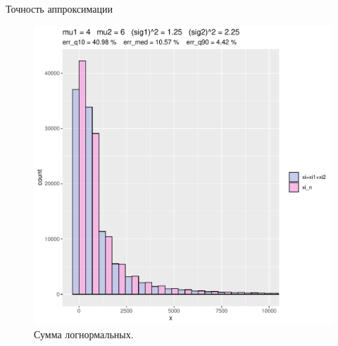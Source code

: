 \documentclass[ucs, notheorems, handout]{beamer}
\begin{document}
\begin{frame}{Точность аппроксимации }
	
	\begin{figure}[h]
		\begin{center}
			\begin{minipage}[h]{0.8\linewidth}
				\includegraphics[width=1\linewidth]{hist_new_2.pdf}
				\caption{Сумма логнормальных.} %
				\label{ris7} %
			\end{minipage}
			
		\end{center}
	\end{figure}	
	
\end{frame}
\end{document}
